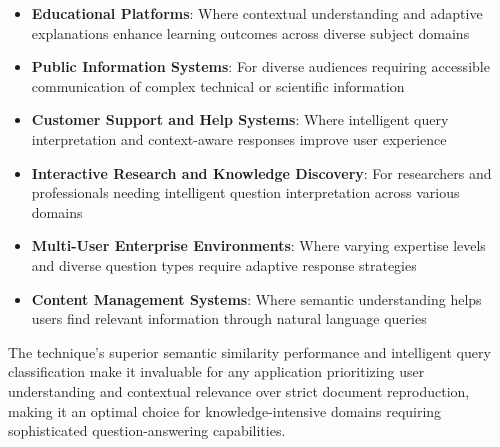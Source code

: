\documentclass[12pt,a4paper]{article}
\begin{document}
\begin{itemize}
    \item \textbf{Educational Platforms}: Where contextual understanding and adaptive explanations enhance learning outcomes across diverse subject domains
    \item \textbf{Public Information Systems}: For diverse audiences requiring accessible communication of complex technical or scientific information
    \item \textbf{Customer Support and Help Systems}: Where intelligent query interpretation and context-aware responses improve user experience
    \item \textbf{Interactive Research and Knowledge Discovery}: For researchers and professionals needing intelligent question interpretation across various domains
    \item \textbf{Multi-User Enterprise Environments}: Where varying expertise levels and diverse question types require adaptive response strategies
    \item \textbf{Content Management Systems}: Where semantic understanding helps users find relevant information through natural language queries
\end{itemize}

The technique's superior semantic similarity performance and intelligent query classification make it invaluable for any application prioritizing user understanding and contextual relevance over strict document reproduction, making it an optimal choice for knowledge-intensive domains requiring sophisticated question-answering capabilities.
\end{document}
